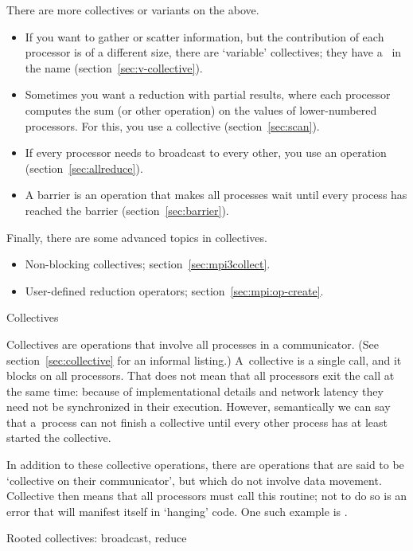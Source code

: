 There are more collectives or variants on the above.
\begin{itemize}
\item If you want to gather or scatter information, but the contribution
  of each processor is of a different size, there are `variable' collectives;
  they have a~ in the name (section~\ref{sec:v-collective}).
\item Sometimes you want a reduction with partial results, where each processor
  computes the sum (or other operation) on the values of lower-numbered processors.
  For this, you use a  collective (section~\ref{sec:scan}).
\item If every processor needs to broadcast to every other, you use an
   operation (section~\ref{sec:allreduce}).
\item A barrier is an operation that makes all processes wait until every
  process has reached the barrier (section~\ref{sec:barrier}).
\end{itemize}

Finally, there are some advanced topics in collectives.
\begin{itemize}
\item Non-blocking collectives; section~\ref{sec:mpi3collect}.
\item User-defined reduction operators; section~\ref{sec:mpi:op-create}.
\end{itemize}

 {Collectives}

Collectives are operations that involve all processes in a
communicator. (See section~\ref{sec:collective} for an informal listing.)
A~collective is a
single call, and it blocks on all processors.
That does not mean that
all processors exit the call at the same time: because of
implementational details and network
latency they need not be synchronized in their execution.
However, semantically we can say that
a~process can not finish
a collective until every other process has at least started the collective.

In addition to these collective operations, there are operations that
are said to be `collective on their communicator', but which do not
involve data movement. Collective then means that all processors must
call this routine; not to do so is an error that will 
manifest itself in `hanging' code. One such example is
.

 {Rooted collectives: broadcast, reduce}


